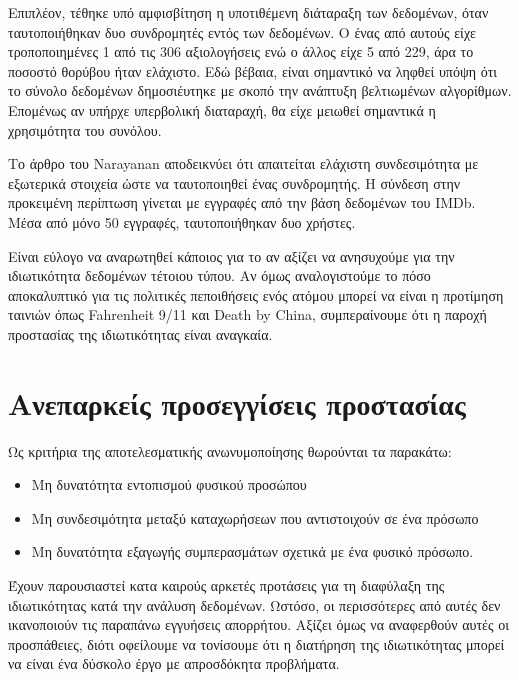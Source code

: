 \begin{itemize}
Επιπλέον, τέθηκε υπό αμφισβίτηση η υποτιθέμενη διάταραξη των δεδομένων, όταν ταυτοποιήθηκαν δυο συνδρομητές εντός των δεδομένων. O ένας από αυτούς είχε τροποποιημένες 1 από τις 306 αξιολογήσεις ενώ ο άλλος είχε 5 από 229, άρα το ποσοστό θορύβου ήταν ελάχιστο. 
Εδώ βέβαια, είναι σημαντικό να ληφθεί υπόψη ότι το σύνολο δεδομένων δημοσιέυτηκε με σκοπό την ανάπτυξη βελτιωμένων αλγορίθμων. Επομένως αν υπήρχε υπερβολική διαταραχή, θα είχε μειωθεί σημαντικά η χρησιμότητα του συνόλου. 

Το άρθρο του \textlatin{Narayanan} αποδεικνύει ότι απαιτείται ελάχιστη συνδεσιμότητα με εξωτερικά στοιχεία ώστε να ταυτοποιηθεί ένας συνδρομητής. Η σύνδεση στην προκειμένη περίπτωση γίνεται με εγγραφές από την βάση δεδομένων του \textlatin{IMDb}. Μέσα από μόνο 50 εγγραφές, ταυτοποιήθηκαν δυο χρήστες. 

Είναι εύλογο να αναρωτηθεί κάποιος για το αν αξίζει να ανησυχούμε για την ιδιωτικότητα δεδομένων τέτοιου τύπου. Αν όμως αναλογιστούμε το πόσο αποκαλυπτικό για τις πολιτικές πεποιθήσεις ενός ατόμου μπορεί να είναι η προτίμηση ταινιών όπως \textlatin{Fahrenheit 9/11} και \textlatin{Death by China}, συμπεραίνουμε ότι η παροχή προστασίας της ιδιωτικότητας είναι αναγκαία. 

\end{itemize}






\section{Ανεπαρκείς προσεγγίσεις προστασίας}

Ως κριτήρια της αποτελεσματικής ανωνυμοποίησης θωρούνται τα παρακάτω:
\begin{itemize}\label{kri}
\item Μη δυνατότητα εντοπισμού φυσικού προσώπου

\item Μη συνδεσιμότητα μεταξύ καταχωρήσεων που αντιστοιχούν σε ένα πρόσωπο

\item Μη δυνατότητα εξαγωγής συμπερασμάτων σχετικά με ένα φυσικό πρόσωπο.
\end{itemize}



Έχουν παρουσιαστεί κατα καιρούς αρκετές προτάσεις για τη διαφύλαξη της ιδιωτικότητας κατά την ανάλυση δεδομένων. Ωστόσο, οι περισσότερες από αυτές δεν ικανοποιούν τις παραπάνω εγγυήσεις απορρήτου. Αξίζει όμως να αναφερθούν αυτές οι προσπάθειες, διότι οφείλουμε να τονίσουμε ότι η διατήρηση της ιδιωτικότητας μπορεί να είναι ένα δύσκολο έργο με απροσδόκητα προβλήματα.

